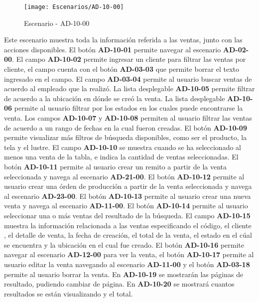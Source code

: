 \begin{figure}[H]
\centering
\texttt{[image: Escenarios/AD-10-00]}
\caption{Escenario - AD-10-00}
\label{fig:AD-10-00}
\end{figure}
Este escenario muestra toda la información referida a las ventas, junto con las acciones disponibles.
El botón \textbf{AD-10-01} permite navegar al escenario \textbf{AD-02-00}. El campo \textbf{AD-10-02} permite ingresar un cliente para filtrar las ventas por cliente, el campo cuenta con el botón \textbf{AD-03-03} que permite borrar el texto ingresado en el campo. El campo \textbf{AD-03-04} permite al usuario buscar ventas de acuerdo al empleado que la realizó. La lista desplegable \textbf{AD-10-05} permite filtrar de acuerdo a la ubicación en dónde se creó la venta. La lista desplegable \textbf{AD-10-06} permite al usuario filtrar por los estados en los cuales puede encontrarse la venta. Los campos  \textbf{AD-10-07} y \textbf{AD-10-08} permiten al usuario filtrar las ventas de acuerdo a un rango de fechas en la cual fueron creadas. El botón \textbf{AD-10-09} permite visualizar más filtros de búsqueda disponibles, como ser el producto, la tela y el lustre.
El campo \textbf{AD-10-10} se muestra cuando se ha seleccionado al menos una venta de la tabla, e indica la cantidad de ventas seleccionadas. El botón \textbf{AD-10-11} permite al usuario crear un remito a partir de la venta seleccionada y navega al escenario \textbf{AD-21-00}. El botón \textbf{AD-10-12} permite al usuario crear una órden de producción a partir de la venta seleccionada y navega al escenario \textbf{AD-23-00}. El botón \textbf{AD-10-13} permite al usuario crear una nueva venta y navega al escenario \textbf{AD-11-00}.
El botón \textbf{AD-10-14} permite al usuario seleccionar una o más ventas del resultado de la búsqueda. El campo \textbf{AD-10-15} muestra la información relacionada a las ventas especificando el código, el cliente , el detalle de venta, la fecha de creación, el total de la venta, el estado en el cúal se encuentra y la ubicación en el cual fue creado. El botón \textbf{AD-10-16} permite navegar al escenario \textbf{AD-12-00} para ver la venta, el botón \textbf{AD-10-17} permite al usuario editar la venta navegando al escenario \textbf{AD-11-00} y el botón \textbf{AD-03-18} permite al usuario borrar la venta. 
En  \textbf{AD-10-19} se mostrarán las páginas de resultado, pudiendo cambiar de página. En \textbf{AD-10-20} se mostrará cuantos resultados se están visualizando y el total.
\clearpage
